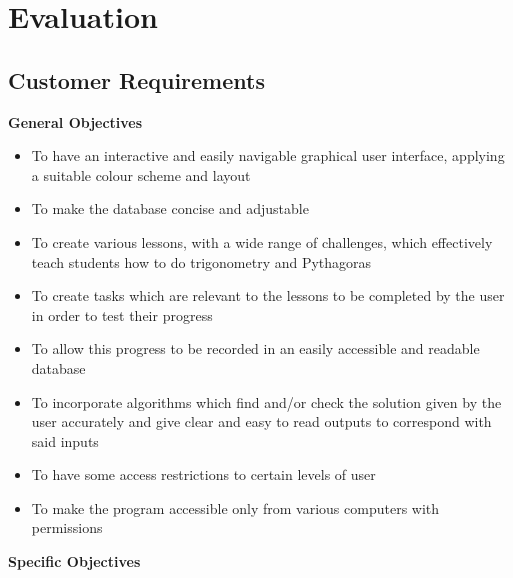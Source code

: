 \chapter{Evaluation}

\section{Customer Requirements}

\textbf{General Objectives}

\begin{itemize}
	\item To have an interactive and easily navigable graphical user interface, applying a suitable colour scheme and layout
	\item To make the database concise and adjustable
	\item To create various lessons, with a wide range of challenges, which effectively teach students how to do trigonometry and Pythagoras
	\item To create tasks which are relevant to the lessons to be completed by the user in order to test their progress
	\item To allow this progress to be recorded in an easily accessible and readable database
	\item To incorporate algorithms which find and/or check the solution given by the user accurately and give clear and easy to read outputs to correspond with said inputs
	\item To have some access restrictions to certain levels of user
	\item To make the program accessible only from various computers with permissions
\end{itemize}

\textbf{Specific Objectives}

